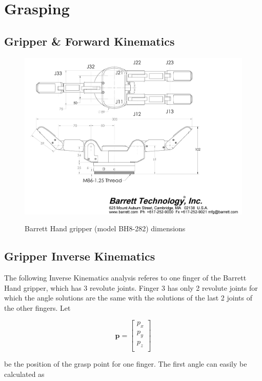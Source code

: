 \section{Grasping}

\subsection{Gripper \& Forward Kinematics}

\begin{center}
\begin{figure}[H]
\centering
\includegraphics[width=12cm]{images/bh8-282-dimensions.png}\\[1cm]
\caption{Barrett Hand gripper (model BH8-282) dimensions}
\end{figure}
\end{center}


\subsection{Gripper Inverse Kinematics}

The following Inverse Kinematics analysis referes to one finger of the Barrett Hand gripper, which has 3 revolute joints. Finger 3 has only 2 
revolute joints for which the angle solutions are the same with the solutions of the last 2 joints of the other fingers. Let

\[
\mathbf{p} = \begin{bmatrix} p_x \\ p_y \\ p_z \\ \end{bmatrix}
\]

be the position of the grasp point for one finger. The first angle can easily be calculated as

